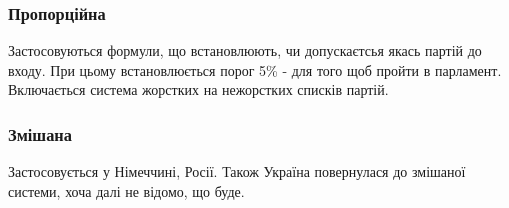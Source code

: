 \subsubsection{Пропорційна}
Застосовуються формули, що встановлюють, чи допускаєтсья якась партій до входу. При цьому встановлюється порог 5\% - для того щоб пройти в парламент. 
Включається система жорстких на нежорстких списків партій.
\subsubsection{Змішана}
Застосовується у Німеччині, Росії. Також Україна повернулася до змішаної системи, хоча далі не відомо, що буде.

 
